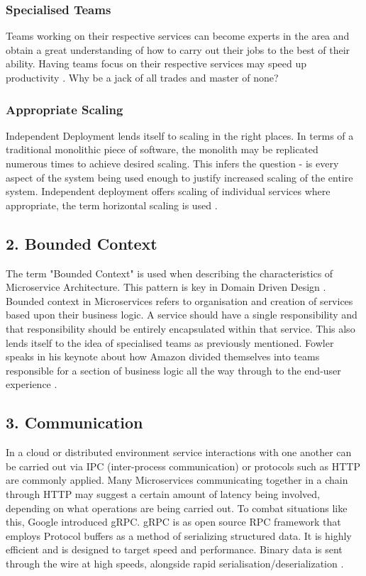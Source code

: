 \documentclass[journal]{IEEEtran}
\begin{document}
\subsubsection*{Specialised Teams}
Teams working on their respective services can become experts in the area and obtain a great understanding of how to carry out their jobs to the best of their ability. Having teams focus on their respective services may speed up productivity \cite{BuildingMicroServices}. Why be a jack of all trades and master of none?

\subsubsection*{Appropriate Scaling}
Independent Deployment lends itself to scaling in the right places. In terms of a traditional monolithic piece of software, the monolith may be replicated numerous times to achieve desired scaling. This infers the question - is every aspect of the system being used enough to justify increased scaling of the entire system. Independent deployment offers scaling of individual services where appropriate, the term horizontal scaling is used \cite{MasteringChaosNetflix}.

\subsection*{ 2. Bounded Context }

The term "Bounded Context" is used when describing the characteristics of Microservice Architecture. This pattern is key in Domain Driven Design \cite{BoundedContext}. Bounded context in Microservices refers to organisation and creation of services based upon their business logic. A service should have a single responsibility and that responsibility should be entirely encapsulated within that service. This also lends itself to the idea of specialised teams as previously mentioned. Fowler speaks in his keynote about how Amazon divided themselves into teams responsible for a section of business logic all the way through to the end-user experience \cite{GOTOConference}. 

\subsection*{ 3. Communication }
In a cloud or distributed environment service interactions with one another can be carried out via IPC (inter-process communication) or protocols such as HTTP are commonly applied. Many Microservices communicating together in a chain through HTTP may suggest a certain amount of latency being involved, depending on what operations are being carried out. To combat situations like this, Google introduced gRPC\cite{gRPC}. gRPC is as open source RPC framework that employs Protocol buffers\cite{ProtocolBuffers} as a method of serializing structured data. It is highly efficient and is designed to target speed and performance. Binary data is sent through the wire at high speeds, alongside rapid serialisation/deserialization \cite{gRPCHackernoon}.
\end{document}
